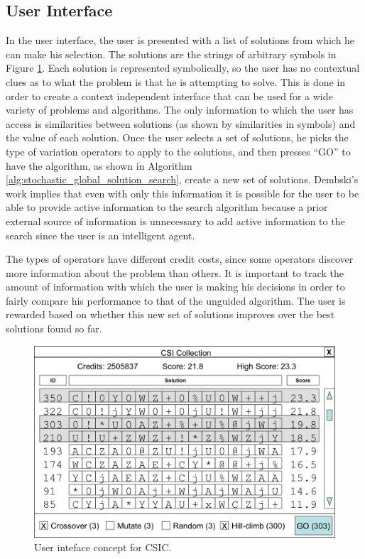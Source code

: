 \subsection{User Interface}

In the user interface, the user is presented with a list of solutions from which he can make his selection.  The solutions are the strings of arbitrary symbols in Figure \ref{fig:CSIC_UI}.  Each solution is represented symbolically, so the user has no contextual clues as to what the problem is that he is attempting to solve.  This is done in order to create a context independent interface that can be used for a wide variety of problems and algorithms. The only information to which the user has access is similarities between solutions (as shown by similarities in symbols) and the value of each solution. Once the user selects a set of solutions, he picks the type of variation operators to apply to the solutions, and then presses ``GO'' to have the algorithm, as shown in Algorithm \ref{alg:stochastic_global_solution_search}, create a new set of solutions.  Dembski's work implies that even with only this information it is possible for the user to be able to provide active information to the search algorithm because a prior external source of information is unnecessary to add active information to the search since the user is an intelligent agent.

The types of operators have different credit costs, since some operators discover more information about the problem than others. It is important to track the amount of information with which the user is making his decisions in order to fairly compare his performance to that of the unguided algorithm.  The user is rewarded based on whether this new set of solutions improves over the best solutions found so far.  

\begin{figure}[!t]
  \centering
  \includegraphics[width=4.5in]{HollowayCSICUI2}
  \caption{User inteface concept for CSIC.}
  \label{fig:CSIC_UI}
\end{figure}

